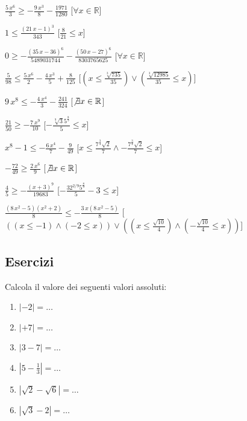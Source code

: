 \begin{esercizio}
\begin{enumeratea}
\item ${\frac {5\,{x}^{6}}{3}}\geq -{\frac {9\,{x}^{3}}{8}}-{\frac 
{1971}{1280}}$ 
\hfill [$\forall x \in \mathbb{R}$]
\item $1\leq {\frac { \left( 21\,x-1 \right) ^{3}}{343}}$ 
\hfill [${\frac {8}{21}}\leq x$]
\item $0\geq -{\frac { \left( 35\,x-36 \right) ^{6}}{5489031744}}-{\frac { 
\left( 50\,x-27 \right) ^{6}}{8303765625}}$ 
\hfill [$\forall x \in \mathbb{R}$]
\item ${\frac {5}{98}}\leq {\frac {5\,{x}^{6}}{2}}-{\frac 
{4\,{x}^{3}}{5}}+{\frac {8}{125}}$ 
\hfill [$(x\leq {\frac {\sqrt [3]{735}}{35}})\vee ({\frac {\sqrt 
[3]{12985}}{35}}\leq x)$]
\item $9\,{x}^{8}\leq -{\frac {4\,{x}^{4}}{3}}-{\frac {241}{324}}$ 
\hfill [$\not\exists x \in \mathbb{R}$]
\item ${\frac {21}{50}}\geq -{\frac {7\,{x}^{9}}{10}}$ 
\hfill [$-{\frac {\sqrt [9]{3}{5}^{{\frac {8}{9}}}}{5}}\leq x$]
\item ${x}^{8}-1\leq -{\frac {6\,{x}^{4}}{7}}-{\frac {9}{49}}$ 
\hfill [$x\leq {\frac {{7}^{{\frac {3}{4}}}\sqrt {2}}{7}} \wedge -{\frac 
{{7}^{{\frac {3}{4}}}\sqrt {2}}{7}}\leq x$]
\item $-{\frac {72}{49}}\geq {\frac {2\,{x}^{6}}{9}}$ 
\hfill [$\not\exists x \in \mathbb{R}$]
\item ${\frac {4}{5}}\geq -{\frac { \left( x+3 \right) ^{9}}{19683}}$ 
\hfill [$-{\frac {3 {2}^{2/9}{5}^{{\frac {8}{9}}}}{5}}-3\leq x$]
\item ${\frac { \left( 8\,{x}^{2}-5 \right)  \left( {x}^{2}+2 \right) }{8}}\leq 
-{\frac {3\,x \left( 8\,{x}^{2}-5 \right) }{8}}$ 
\hfill [$((x\leq -1) \wedge (-2\leq x))\vee ((x\leq {\frac {\sqrt {10}}{4}}) 
\wedge (-{\frac {\sqrt {10}}{4}}\leq x))$]
\end{enumeratea}
\end{esercizio}




\subsection{Esercizi}

Calcola il valore dei seguenti valori assoluti:
\begin{enumerate}
\item $|-2|=\dots$
\item $|+7|=\dots$
\item $|3-7|=\dots$
\item $|5-\frac{1}{3}|=\dots$
\item $|\sqrt{2}-\sqrt{6}|=\dots$
\item $|\sqrt{3}-2|=\dots$
\end{enumerate}

